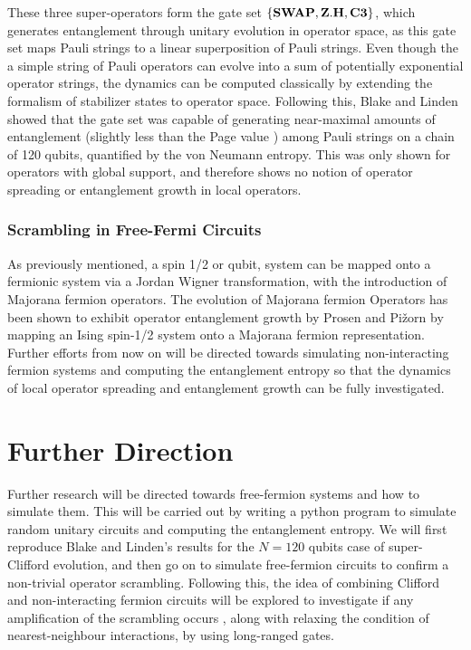 These three super-operators form the gate set $\{ {\bf SWAP}, {\bf Z.H}, {\bf C3}\}$, which generates entanglement
through unitary evolution in operator space, as this gate set maps Pauli strings to a linear superposition of Pauli strings.
Even though the a simple string of Pauli operators can evolve into a sum of potentially exponential operator strings,
the dynamics can be computed classically by extending the formalism of stabilizer states to operator space.
Following this, Blake and Linden showed that the gate set was capable of generating near-maximal amounts
of entanglement (slightly less than the Page value \cite{Page_1993}) among Pauli strings on a chain of 120 qubits,
quantified by the von Neumann entropy. This was only shown for operators with global support, and therefore
shows no notion of operator spreading or entanglement growth in local operators.

\subsubsection{Scrambling in Free-Fermi Circuits}
As previously mentioned, a spin 1/2 or qubit, system can be mapped onto a fermionic system via a Jordan Wigner
transformation, with the introduction of Majorana fermion operators. The evolution of Majorana fermion Operators
has been shown to exhibit operator entanglement growth by Prosen and Pi\v{z}orn \cite{Prosen_2007} by mapping an Ising spin-1/2
system onto a Majorana fermion representation. Further efforts from now on will be directed towards simulating
non-interacting fermion systems and computing the entanglement entropy so that the dynamics of local operator spreading
and entanglement growth can be fully investigated.

\section{Further Direction}
Further research will be directed towards free-fermion systems and how to simulate them. This will be carried out
by writing a python program to simulate random unitary circuits and computing the entanglement entropy. We will first
reproduce Blake and Linden's results for the $N = 120$ qubits case of super-Clifford evolution, and then go on to
simulate free-fermion circuits to confirm a non-trivial operator scrambling. Following this, the idea of combining
Clifford and non-interacting fermion circuits will be explored to investigate if any amplification of the
scrambling occurs \cite{Jozsa2008}, along with relaxing the condition of nearest-neighbour interactions, by using
long-ranged gates.



